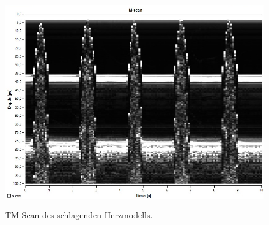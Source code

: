 \begin{figure}[H]
  \centering
  \includegraphics[height=9cm]{messdaten/herz.png}
  \caption{TM-Scan des schlagenden Herzmodells.}
  \label{figure:3}
\end{figure}

